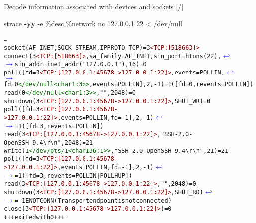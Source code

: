 \documentclass[unicode,aspectratio=169,xcolor={table,dvipsnames,usernames}]{beamer}
\newcommand{\symlinebreak}{\textcolor{blue}{\(\hookleftarrow\)}}
\newcommand{\symlinecont}{\textcolor{blue}{\(\longrightarrow\)}}
\begin{document}
\begin{frame}[fragile]{Decode information associated with devices and sockets \hfill [\insertframenumber/\inserttotalframenumber]}
\begin{block}{\large strace \textbf{-yy} -e \%desc,\%network nc 127.0.0.1 22 < /dev/null}
\scriptsize
\begin{alltt}
\ldots
socket(AF_INET, SOCK_STREAM, IPPROTO_TCP) = 3\textcolor{darkred}{<TCP:[518663]>}
connect(3\textcolor{darkred}{<TCP:[518663]>}, {sa_family=AF_INET, sin_port=htons(22), \symlinebreak
\symlinecont sin_addr=inet_addr("127.0.0.1")}, 16) = 0
poll([{fd=3\textcolor{darkred}{<TCP:[127.0.0.1:45678->127.0.0.1:22]>}, events=POLLIN}, \symlinebreak
\symlinecont {fd=0\textcolor{darkgreen}{</dev/null<char 1:3>>}, events=POLLIN}], 2, -1) = 1 ([{fd=0, revents=POLLIN}])
read(0\textcolor{darkgreen}{</dev/null<char 1:3>>}, "", 2048)  = 0
shutdown(3\textcolor{darkred}{<TCP:[127.0.0.1:45678->127.0.0.1:22]>}, SHUT_WR) = 0
poll([{fd=3\textcolor{darkred}{<TCP:[127.0.0.1:45678->127.0.0.1:22]>}, events=POLLIN}, {fd=-1}], 2, -1) \symlinebreak
\symlinecont = 1 ([{fd=3, revents=POLLIN}])
read(3\textcolor{darkred}{<TCP:[127.0.0.1:45678->127.0.0.1:22]>}, "SSH-2.0-OpenSSH_9.4{\textbackslash}r{\textbackslash}n", 2048) = 21
write(1\textcolor{darkgreen}{</dev/pts/1<char 136:1>>}, "SSH-2.0-OpenSSH_9.4{\textbackslash}r{\textbackslash}n", 21) = 21
poll([{fd=3\textcolor{darkred}{<TCP:[127.0.0.1:45678->127.0.0.1:22]>}, events=POLLIN}, {fd=-1}], 2, -1) \symlinebreak
\symlinecont = 1 ([{fd=3, revents=POLLIN|POLLHUP}])
read(3\textcolor{darkred}{<TCP:[127.0.0.1:45678->127.0.0.1:22]>}, "", 2048) = 0
shutdown(3\textcolor{darkred}{<TCP:[127.0.0.1:45678->127.0.0.1:22]>}, SHUT_RD) \symlinebreak
\symlinecont = -1 ENOTCONN (Transport endpoint is not connected)
close(3\textcolor{darkred}{<TCP:[127.0.0.1:45678->127.0.0.1:22]>}) = 0
+++ exited with 0 +++
\end{alltt}
\end{block}
\end{frame}
\end{document}
